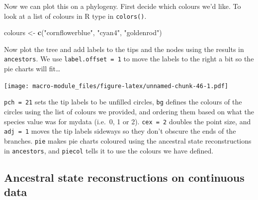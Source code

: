 \documentclass[]{book}
\newenvironment{Shaded}{\begin{snugshade}}{\end{snugshade}}
\newcommand{\KeywordTok}[1]{\textcolor[rgb]{0.13,0.29,0.53}{\textbf{{#1}}}}
\newcommand{\DataTypeTok}[1]{\textcolor[rgb]{0.13,0.29,0.53}{{#1}}}
\newcommand{\DecValTok}[1]{\textcolor[rgb]{0.00,0.00,0.81}{{#1}}}
\newcommand{\StringTok}[1]{\textcolor[rgb]{0.31,0.60,0.02}{{#1}}}
\newcommand{\NormalTok}[1]{{#1}}
\begin{document}
Now we can plot this on a phylogeny. First decide which colours we'd
like. To look at a list of colours in R type in \texttt{colors()}.

\begin{Shaded}
\begin{Highlighting}[]
\NormalTok{colours <-}\StringTok{ }\KeywordTok{c}\NormalTok{(}\StringTok{"cornflowerblue"}\NormalTok{, }\StringTok{"cyan4"}\NormalTok{, }\StringTok{"goldenrod"}\NormalTok{)}
\end{Highlighting}
\end{Shaded}

Now plot the tree and add labels to the tips and the nodes using the
results in \texttt{ancestors}. We use \texttt{label.offset\ =\ 1} to
move the labels to the right a bit so the pie charts will fit\ldots{}

\begin{Shaded}
\end{Shaded}

\texttt{[image: macro-module\_files/figure-latex/unnamed-chunk-46-1.pdf]}

\texttt{pch\ =\ 21} sets the tip labels to be unfilled circles,
\texttt{bg} defines the colours of the circles using the list of colours
we provided, and ordering them based on what the species value was for
mydata (i.e.~0, 1 or 2). \texttt{cex\ =\ 2} doubles the point size, and
\texttt{adj\ =\ 1} moves the tip labels sideways so they don't obscure
the ends of the branches. \texttt{pie} makes pie charts coloured using
the ancestral state reconstructions in \texttt{ancestors}, and
\texttt{piecol} tells it to use the colours we have defined.

\subsection{Ancestral state reconstructions on continuous
data}\label{ancestral-state-reconstructions-on-continuous-data}
\end{document}
